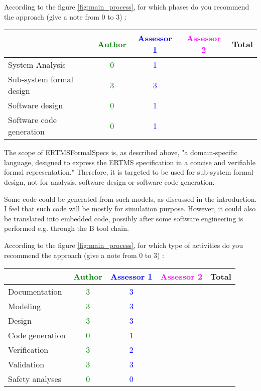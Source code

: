 According to the figure \ref{fig:main_process}, for which phases do you recommend the approach (give a note from 0 to  3) :

\begin{tabular}{|l | c | c | c | c|}
\hline
& \textcolor{green}{Author} & \textcolor{blue}{Assessor 1} & \textcolor{magenta}{Assessor 2} & Total \\
\hline 
System Analysis & \textcolor{green}{0} & \textcolor{blue}{1} & &  \\
\hline
Sub-system formal design & \textcolor{green}{3} & \textcolor{blue}{3} & & \\
\hline
Software design & \textcolor{green}{0} & \textcolor{blue}{1} & & \\
\hline
Software code generation & \textcolor{green}{0} & \textcolor{blue}{1} & & \\
\hline
\end{tabular}

\begin{author_comment}
The scope of ERTMSFormalSpecs is, as described above, "a domain-specific language, designed to express the ERTMS specification in a concise and verifiable formal representation."
Therefore, it is targeted to be used for sub-system formal design, not for analysis, software design or software code generation.
\end{author_comment}

\begin{assessor1}
Some code could be generated from such models, as discussed in the introduction. I feel that such code will be mostly for simulation purpose. However, it could also be translated into embedded code, possibly after some software engineering is performed e.g. through the B tool chain. 
\end{assessor1}

According to the figure \ref{fig:main_process}, for which type of activities do you recommend the approach (give a note from 0 to  3) :

\begin{tabular}{|l | c | c | c | c|}
\hline
& \textcolor{green}{Author} & \textcolor{blue}{Assessor 1} & \textcolor{magenta}{Assessor 2} & Total \\
\hline 
Documentation & \textcolor{green}{3} & \textcolor{blue}{3} & &  \\
\hline
Modeling & \textcolor{green}{3} & \textcolor{blue}{3} & &  \\
\hline
Design & \textcolor{green}{3} & \textcolor{blue}{3} & & \\
\hline
Code generation & \textcolor{green}{0} & \textcolor{blue}{1} & & \\
\hline
Verification & \textcolor{green}{3} & \textcolor{blue}{2} & & \\
\hline
Validation & \textcolor{green}{3} & \textcolor{blue}{3} & & \\
\hline
Safety analyses & \textcolor{green}{0} & \textcolor{blue}{0} & & \\
\hline
\end{tabular}

